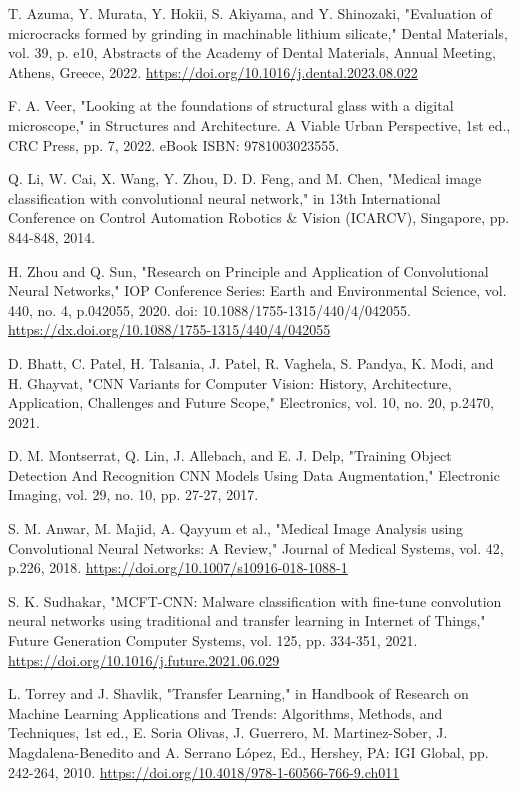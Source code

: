 \begin{thebibliography}{99}
    T. Azuma, Y. Murata, Y. Hokii, S. Akiyama, and Y. Shinozaki, "Evaluation of microcracks formed by grinding in machinable lithium silicate," Dental Materials, vol. 39, p. e10, Abstracts of the Academy of Dental Materials, Annual Meeting, Athens, Greece, 2022. \url{https://doi.org/10.1016/j.dental.2023.08.022}
    
    F. A. Veer, "Looking at the foundations of structural glass with a digital microscope," in Structures and Architecture. A Viable Urban Perspective, 1st ed., CRC Press, pp. 7, 2022. eBook ISBN: 9781003023555.
    
    Q. Li, W. Cai, X. Wang, Y. Zhou, D. D. Feng, and M. Chen, "Medical image classification with convolutional neural network," in 13th International Conference on Control Automation Robotics \& Vision (ICARCV), Singapore, pp. 844-848, 2014.
    
    H. Zhou and Q. Sun, "Research on Principle and Application of Convolutional Neural Networks," IOP Conference Series: Earth and Environmental Science, vol. 440, no. 4, p.042055, 2020. doi: 10.1088/1755-1315/440/4/042055. \url{https://dx.doi.org/10.1088/1755-1315/440/4/042055}
    
    D. Bhatt, C. Patel, H. Talsania, J. Patel, R. Vaghela, S. Pandya, K. Modi, and H. Ghayvat, "CNN Variants for Computer Vision: History, Architecture, Application, Challenges and Future Scope," Electronics, vol. 10, no. 20, p.2470, 2021.
    
    D. M. Montserrat, Q. Lin, J. Allebach, and E. J. Delp, "Training Object Detection And Recognition CNN Models Using Data Augmentation," Electronic Imaging, vol. 29, no. 10, pp. 27-27, 2017.
    
    S. M. Anwar, M. Majid, A. Qayyum et al., "Medical Image Analysis using Convolutional Neural Networks: A Review," Journal of Medical Systems, vol. 42, p.226, 2018. \url{https://doi.org/10.1007/s10916-018-1088-1}
    
    S. K. Sudhakar, "MCFT-CNN: Malware classification with fine-tune convolution neural networks using traditional and transfer learning in Internet of Things," Future Generation Computer Systems, vol. 125, pp. 334-351, 2021. \url{https://doi.org/10.1016/j.future.2021.06.029}
    
    L. Torrey and J. Shavlik, "Transfer Learning," in Handbook of Research on Machine Learning Applications and Trends: Algorithms, Methods, and Techniques, 1st ed., E. Soria Olivas, J. Guerrero, M. Martinez-Sober, J. Magdalena-Benedito and A. Serrano López, Ed., Hershey, PA: IGI Global, pp. 242-264, 2010. \url{https://doi.org/10.4018/978-1-60566-766-9.ch011}
    

\end{thebibliography}
